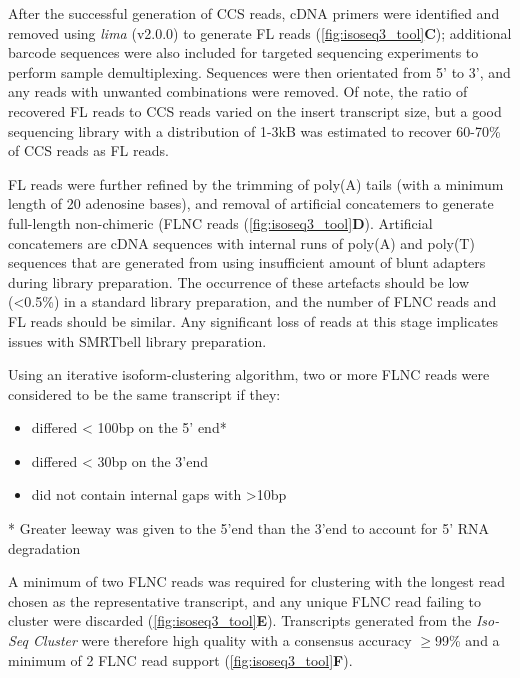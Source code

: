 After the successful generation of CCS reads, cDNA primers were identified and removed using \textit{lima} (v2.0.0) to generate FL reads (\cref{fig:isoseq3_tool}\textbf{C}); additional barcode sequences were also included for targeted sequencing experiments to perform sample demultiplexing. Sequences were then orientated from 5’ to 3’, and any reads with unwanted combinations were removed. Of note, the ratio of recovered FL reads to CCS reads varied on the insert transcript size, but a good sequencing library with a distribution of 1-3kB was estimated to recover 60-70\% of CCS reads as FL reads.   

FL reads were further refined by the trimming of poly(A) tails (with a minimum length of 20 adenosine bases), and removal of artificial concatemers to generate full-length non-chimeric (FLNC reads (\cref{fig:isoseq3_tool}\textbf{D}). Artificial concatemers are cDNA sequences with internal runs of poly(A) and poly(T) sequences that are generated from using insufficient amount of blunt adapters during library preparation. The occurrence of these artefacts should be low (<0.5\%) in a standard library preparation, and the number of FLNC reads and FL reads should be similar. Any significant loss of reads at this stage implicates issues with SMRTbell library preparation.

Using an iterative isoform-clustering algorithm, two or more FLNC reads were considered to be the same transcript if they: 
\begin{itemize}
	\item differed < 100bp on the 5’ end* 
	\item differed < 30bp on the 3’end 
	\item did not contain internal gaps with >10bp
\end{itemize}
* Greater leeway was given to the 5'end than the 3'end to account for 5' RNA degradation

A minimum of two FLNC reads was required for clustering with the longest read chosen as the representative transcript, and any unique FLNC read failing to cluster were discarded (\cref{fig:isoseq3_tool}\textbf{E}). Transcripts generated from the \textit{Iso-Seq Cluster} were therefore high quality with a consensus accuracy $\geq$99\% and a minimum of 2 FLNC read support (\cref{fig:isoseq3_tool}\textbf{F}). 

